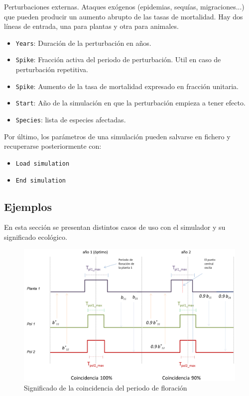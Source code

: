 Perturbaciones externas. Ataques exógenos (epidemias, sequías, migraciones...) que pueden producir un aumento abrupto de las tasas
de mortalidad. Hay dos líneas de entrada, una para plantas y otra para animales.

\begin{itemize}
 \item \texttt{Years}: Duración de la perturbación en años.
 \item \texttt{Spike}: Fracción activa del periodo de perturbación. Util en caso de perturbación repetitiva.
 \item \texttt{Spike}: Aumento de la tasa de mortalidad expresado en fracción unitaria.
 \item \texttt{Start}: Año de la simulación en que la perturbación empieza a tener efecto.
 \item \texttt{Species}: lista de especies afectadas.
\end{itemize}

Por último, los parámetros de una simulación pueden salvarse en fichero y recuperarse posteriormente con:
\begin{itemize}
 \item \texttt{Load simulation}
 \item \texttt{End simulation}
\end{itemize}

\subsection*{Ejemplos}

En esta sección se presentan distintos casos de uso con el simulador y su significado ecológico.

\begin{figure}[h!]
\centering
\includegraphics[scale=1]{ManFigs/sigmund_tiempos.png}
\caption{Significado de la coincidencia del periodo de floración}
\label{fig:ASIGMUNDMAN_sigmund_tiempos}
\end{figure}

